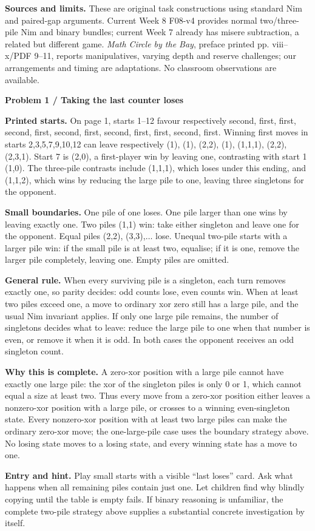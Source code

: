 \documentclass[11pt]{article}
\newcommand{\parttitle}[1]{{\large\bfseries\color{ink}#1}\par}
\newcommand{\labelled}[2]{\textbf{#1} #2\par}
\begin{document}
\labelled{Sources and limits.}{These are original task constructions using standard Nim and paired-gap arguments. Current Week 8 F08-v4 provides normal two/three-pile Nim and binary bundles; current Week 7 already has misere subtraction, a related but different game. \emph{Math Circle by the Bay}, preface printed pp. viii--x/PDF 9--11, reports manipulatives, varying depth and reserve challenges; our arrangements and timing are adaptations. No classroom observations are available.}
\newpage
\parttitle{Problem 1 / Taking the last counter loses}
\labelled{Printed starts.}{On page 1, starts 1--12 favour respectively second, first, first, second, first, second, first, second, first, first, second, first. Winning first moves in starts 2,3,5,7,9,10,12 can leave respectively (1), (1), (2,2), (1), (1,1,1), (2,2), (2,3,1). Start 7 is (2,0), a first-player win by leaving one, contrasting with start 1 (1,0). The three-pile contrasts include (1,1,1), which loses under this ending, and (1,1,2), which wins by reducing the large pile to one, leaving three singletons for the opponent.}
\labelled{Small boundaries.}{One pile of one loses. One pile larger than one wins by leaving exactly one. Two piles (1,1) win: take either singleton and leave one for the opponent. Equal piles (2,2), (3,3),$\ldots$ lose. Unequal two-pile starts with a larger pile win: if the small pile is at least two, equalise; if it is one, remove the larger pile completely, leaving one. Empty piles are omitted.}
\labelled{General rule.}{When every surviving pile is a singleton, each turn removes exactly one, so parity decides: odd counts lose, even counts win. When at least two piles exceed one, a move to ordinary xor zero still has a large pile, and the usual Nim invariant applies. If only one large pile remains, the number of singletons decides what to leave: reduce the large pile to one when that number is even, or remove it when it is odd. In both cases the opponent receives an odd singleton count.}
\labelled{Why this is complete.}{A zero-xor position with a large pile cannot have exactly one large pile: the xor of the singleton piles is only 0 or 1, which cannot equal a size at least two. Thus every move from a zero-xor position either leaves a nonzero-xor position with a large pile, or crosses to a winning even-singleton state. Every nonzero-xor position with at least two large piles can make the ordinary zero-xor move; the one-large-pile case uses the boundary strategy above. No losing state moves to a losing state, and every winning state has a move to one.}
\labelled{Entry and hint.}{Play small starts with a visible ``last loses'' card. Ask what happens when all remaining piles contain just one. Let children find why blindly copying until the table is empty fails. If binary reasoning is unfamiliar, the complete two-pile strategy above supplies a substantial concrete investigation by itself.}
\end{document}
